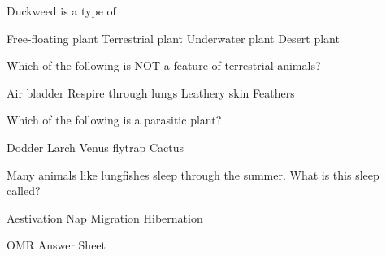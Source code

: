 \documentclass[a4paper,answers]{exam}
\begin{document}
\begin{questions}
    \question Duckweed is a type of \fillin

    \begin{randomizeoneparchoices}
        \CorrectChoice Free-floating plant
        \choice Terrestrial plant
        \choice Underwater plant
        \choice Desert plant
    \end{randomizeoneparchoices}

    \question Which of the following is NOT a feature of terrestrial animals?

    \begin{randomizeoneparchoices}
        \CorrectChoice Air bladder
        \choice Respire through lungs
        \choice Leathery skin
        \choice Feathers
    \end{randomizeoneparchoices}
    
    \question Which of the following is a parasitic plant?

    \begin{randomizeoneparchoices}
        \CorrectChoice Dodder
        \choice Larch
        \choice Venus flytrap
        \choice Cactus
    \end{randomizeoneparchoices}
    
    \question Many animals like lungfishes sleep through the summer. What is this sleep called?

    \begin{randomizeoneparchoices}
        \CorrectChoice Aestivation
        \choice Nap
        \choice Migration
        \choice Hibernation
    \end{randomizeoneparchoices}
    
\end{questions}

\vspace{10mm}
\Huge OMR Answer Sheet

\end{document}

